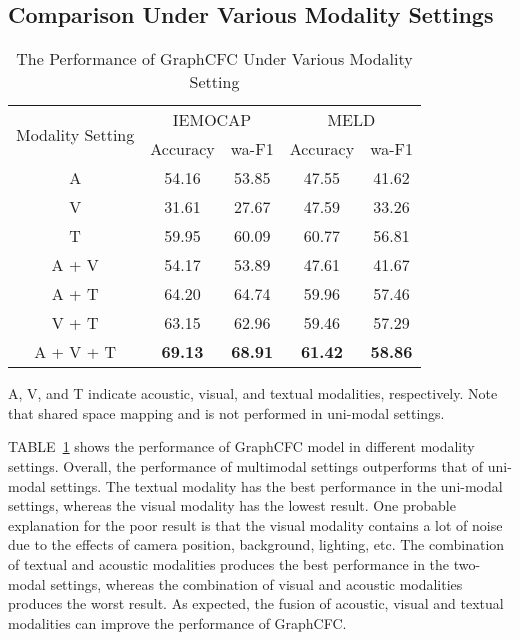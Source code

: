 \documentclass[lettersize,journal]{IEEEtran}
\begin{document}
\subsection{Comparison Under Various Modality Settings}
\begin{table}[htbp]
\centering
\renewcommand{\arraystretch}{1.0}
\setlength{\tabcolsep}{8pt}
\caption{The Performance of GraphCFC Under Various Modality Setting}
\begin{threeparttable}
\begin{tabular}{c|cc||cc}
\hline
\multicolumn{1}{c|}{\multirow{2}[1]{*}{Modality Setting}} & \multicolumn{2}{c||}{IEMOCAP}  & \multicolumn{2}{c}{MELD} \\
\cline{2-5}
& Accuracy & wa-F1 & Accuracy & wa-F1 \\
\hline
A     & 54.16  & 53.85  & 47.55  & 41.62  \\
V     & 31.61  & 27.67  & 47.59  & 33.26  \\
T     & 59.95  & 60.09  & 60.77  & 56.81  \\
\hline
A + V   & 54.17  & 53.89  & 47.61  & 41.67  \\
A + T   & 64.20  & 64.74  & 59.96  & 57.46  \\
V + T   & 63.15  & 62.96  & 59.46  & 57.29  \\
\hline
A + V + T & \textbf{69.13}  & \textbf{68.91}  & \textbf{61.42} & \textbf{58.86} \\
\hline
\end{tabular}\label{tab:modality-setting}A, V, and T indicate acoustic, visual, and textual modalities, respectively. Note that shared space mapping and  is not performed in uni-modal settings.
\end{threeparttable}
\end{table}TABLE~\ref{tab:modality-setting} shows the performance of GraphCFC model in different modality settings. Overall, the performance of multimodal settings outperforms that of uni-modal settings. The textual modality has the best performance in the uni-modal settings, whereas the visual modality has the lowest result. One probable explanation for the poor result is that the visual modality contains a lot of noise due to the effects of camera position, background, lighting, etc. The combination of textual and acoustic modalities produces the best performance in the two-modal settings, whereas the combination of visual and acoustic modalities produces the worst result. As expected, the fusion of acoustic, visual and textual modalities can improve the performance of GraphCFC.
      
\end{document}
